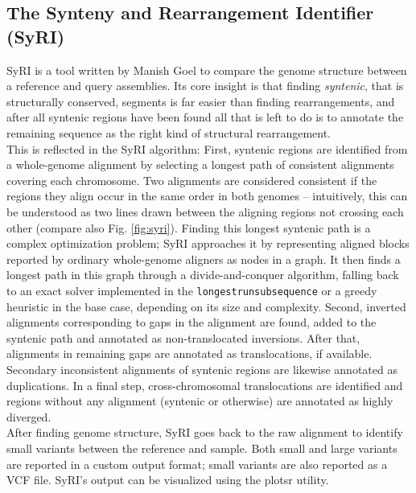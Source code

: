 \subsection*{The Synteny and Rearrangement Identifier (SyRI)}
SyRI is a tool written by Manish Goel to compare the genome structure between a reference and query assemblies\cite{goel19}.
Its core insight is that finding \emph{syntenic}, that is structurally conserved, segments is far easier than finding rearrangements, and after all syntenic regions have been found all that is left to do is to annotate the remaining sequence as the right kind of structural rearrangement.\\
This is reflected in the SyRI algorithm:
First, syntenic regions are identified from a whole-genome alignment by selecting a longest path of consistent alignments covering each chromosome.
Two alignments are considered consistent if the regions they align occur in the same order in both genomes -- intuitively, this can be understood as two lines drawn between the aligning regions not crossing each other (compare also Fig. \ref{fig:syri}).
Finding this longest syntenic path is a complex optimization problem;%
SyRI approaches it by representing aligned blocks reported by ordinary whole-genome aligners as nodes in a graph.
It then finds a longest path in this graph through a divide-and-conquer algorithm, falling back to an exact solver implemented in the \texttt{longestrunsubsequence} or a greedy heuristic in the base case, depending on its size and complexity. %
Second, inverted alignments corresponding to gaps in the alignment are found, added to the syntenic path and annotated as non-translocated inversions.
After that, alignments in remaining gaps are annotated as translocations, if available.
Secondary inconsistent alignments of syntenic regions are likewise annotated as duplications.
In a final step, cross-chromosomal translocations are identified and regions without any alignment (syntenic or otherwise) are annotated as highly diverged.\\
After finding genome structure, SyRI goes back to the raw alignment to identify small variants between the reference and sample.
Both small and large variants are reported in a custom output format; small variants are also reported as a VCF file.
SyRI's output can be visualized using the plotsr utility\cite{goel22}.

